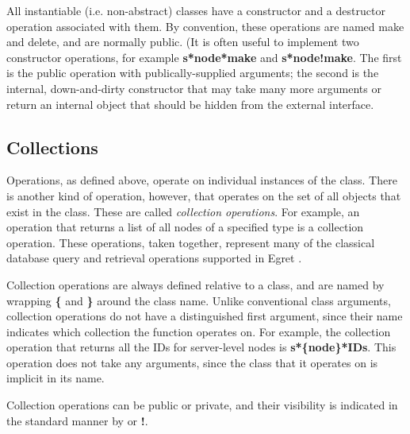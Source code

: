 All instantiable (i.e. non-abstract) classes have a constructor and a
destructor operation associated with them.  By convention, these
operations are named {\sf make} and {\sf delete}, and are normally
public.  (It is often useful to implement two constructor operations,
for example {\bf s*node*make} and {\bf s*node!make}.  The first is the
public operation with publically-supplied arguments; the second is the
internal, down-and-dirty constructor that may take many more arguments
or return an internal object that should be hidden from the external
interface.

\subsection{Collections}

Operations, as defined above, operate on individual instances of the
class. There is another kind of operation, however, that operates on
the set of all objects that exist in the class. These are called {\em
collection operations}.  For example, an operation that returns a list
of all nodes of a specified type is a collection operation.  These
operations, taken together, represent many of the classical database
query and retrieval operations supported in Egret .

Collection operations are always defined relative to a class, and are
named by wrapping {\bf \{} and {\bf \}} around the class name.  Unlike
conventional class arguments, collection operations do not have a
distinguished first argument, since their name indicates which
collection the function operates on.  For example, the collection operation that returns all the
IDs for server-level nodes is {\bf s*\{node\}*IDs}.  This operation
does not take any arguments, since the class that it operates on is
implicit in its name.

Collection operations can be public or private, and their visibility is
indicated in the standard manner by {\bf *} or {\bf !}.

